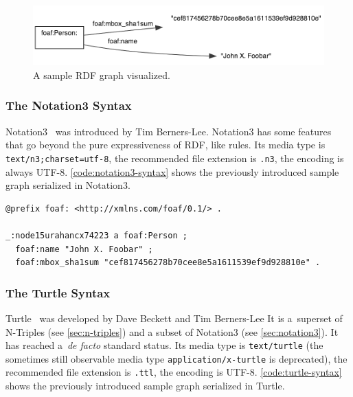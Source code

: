 \begin{figure}[htbp!]
\begin{center}
 \includegraphics[width=\linewidth]{sample-rdf-graph.png} 
 \caption{A sample RDF graph visualized.}
 \label{fig:sample-rdf-graph}
 \end{center}  
\end{figure}

\subsubsection{The Notation3 Syntax} \label{sec:notation3}
Notation3~\cite{BernersLee2011} was introduced by Tim Berners-Lee.
Notation3 has some features that go beyond the pure expressiveness of RDF, like rules.
Its media type is \texttt{text/n3;\-charset=utf-8},
the recommended file extension is \texttt{.n3}, the encoding is always UTF-8.
\autoref{code:notation3-syntax} shows the previously introduced sample graph serialized in Notation3.

\begin{lstlisting}[caption={A sample graph in Notation3 syntax.},label={code:notation3-syntax}]
@prefix foaf: <http://xmlns.com/foaf/0.1/> .

_:node15urahancx74223 a foaf:Person ;
  foaf:name "John X. Foobar" ;
  foaf:mbox_sha1sum "cef817456278b70cee8e5a1611539ef9d928810e" .
\end{lstlisting}

\subsubsection{The Turtle Syntax} \label{sec:turtle}
Turtle~\cite{Prudhommeaux2011} was developed by Dave Beckett and Tim Berners-Lee
It is a~superset of N-Triples (see \autoref{sec:n-triples}) and
a subset of Notation3 (see \autoref{sec:notation3}).
It has reached a~\emph{de facto} standard status.
Its media type is \texttt{text/turtle}
(the sometimes still observable media type \texttt{application/x-turtle} is deprecated),
the recommended file extension is \texttt{.ttl}, the encoding is UTF-8.
\autoref{code:turtle-syntax} shows the previously introduced sample graph serialized in Turtle.

